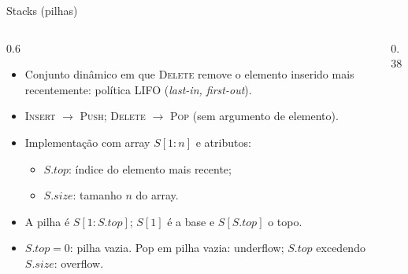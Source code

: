 \documentclass[aspectratio=169,10pt]{beamer}
\newcommand{\proc}[1]{\textnormal{\rmfamily\textsc{#1}}}
\newcommand{\at}[1]{.\mathit{#1}}
\begin{document}
\begin{frame}{Stacks (pilhas)}
  \begin{columns}[c]
    \begin{column}{0.6\textwidth}
      \begin{itemize}
        \item Conjunto dinâmico em que \proc{Delete} remove o elemento
              \alert{inserido mais recentemente}: política \alert{LIFO}
              (\emph{last-in, first-out}).
        \item \proc{Insert} $\to$ \proc{Push}; \proc{Delete} $\to$ \proc{Pop}
              (sem argumento de elemento).
        \item Implementação com array $S[1:n]$ e atributos:
          \begin{itemize}
            \item $S\at{top}$: índice do elemento mais recente;
            \item $S\at{size}$: tamanho $n$ do array.
          \end{itemize}
        \item A pilha é $S[1:S\at{top}]$; $S[1]$ é a base e $S[S\at{top}]$ o topo.
        \item $S\at{top}=0$: pilha vazia. Pop em pilha vazia: \alert{underflow};
              $S\at{top}$ excedendo $S\at{size}$: \alert{overflow}.
      \end{itemize}
    \end{column}
    \begin{column}{0.38\textwidth}
      \centering
    \end{column}
  \end{columns}
\end{frame}
\end{document}
